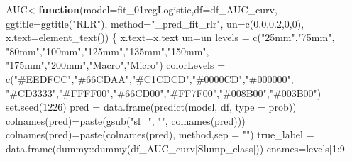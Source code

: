 \documentclass[
]{article}
\newenvironment{Shaded}{\begin{snugshade}}{\end{snugshade}}
\newcommand{\AttributeTok}[1]{\textcolor[rgb]{0.77,0.63,0.00}{#1}}
\newcommand{\ControlFlowTok}[1]{\textcolor[rgb]{0.13,0.29,0.53}{\textbf{#1}}}
\newcommand{\DecValTok}[1]{\textcolor[rgb]{0.00,0.00,0.81}{#1}}
\newcommand{\FloatTok}[1]{\textcolor[rgb]{0.00,0.00,0.81}{#1}}
\newcommand{\FunctionTok}[1]{\textcolor[rgb]{0.00,0.00,0.00}{#1}}
\newcommand{\NormalTok}[1]{#1}
\newcommand{\OtherTok}[1]{\textcolor[rgb]{0.56,0.35,0.01}{#1}}
\newcommand{\SpecialCharTok}[1]{\textcolor[rgb]{0.00,0.00,0.00}{#1}}
\newcommand{\StringTok}[1]{\textcolor[rgb]{0.31,0.60,0.02}{#1}}
\begin{document}
\begin{Shaded}
\begin{Highlighting}[]
\NormalTok{AUC}\OtherTok{\textless{}{-}}\ControlFlowTok{function}\NormalTok{(}\AttributeTok{model=}\NormalTok{fit\_01regLogistic,}\AttributeTok{df=}\NormalTok{df\_AUC\_curv, }\AttributeTok{ggtitle=}\FunctionTok{ggtitle}\NormalTok{(}\StringTok{"RLR"}\NormalTok{),}
              \AttributeTok{method=}\StringTok{"\_pred\_fit\_rlr"}\NormalTok{, }\AttributeTok{un=}\FunctionTok{c}\NormalTok{(}\FloatTok{0.0}\NormalTok{,}\FloatTok{0.2}\NormalTok{,}\DecValTok{0}\NormalTok{,}\DecValTok{0}\NormalTok{),}
              \AttributeTok{x.text=}\FunctionTok{element\_text}\NormalTok{()) \{}
\NormalTok{    x.text}\OtherTok{=}\NormalTok{x.text}
\NormalTok{    un}\OtherTok{=}\NormalTok{un}
\NormalTok{    levels }\OtherTok{=} \FunctionTok{c}\NormalTok{(}\StringTok{"25mm"}\NormalTok{,}\StringTok{"75mm"}\NormalTok{, }\StringTok{"80mm"}\NormalTok{,}\StringTok{"100mm"}\NormalTok{,}\StringTok{"125mm"}\NormalTok{,}\StringTok{"135mm"}\NormalTok{,}\StringTok{"150mm"}\NormalTok{,}
               \StringTok{"175mm"}\NormalTok{,}\StringTok{"200mm"}\NormalTok{,}\StringTok{"Macro"}\NormalTok{,}\StringTok{"Micro"}\NormalTok{)}
\NormalTok{    colorLevels }\OtherTok{=} \FunctionTok{c}\NormalTok{(}\StringTok{"\#EEDFCC"}\NormalTok{,}\StringTok{"\#66CDAA"}\NormalTok{,}\StringTok{"\#C1CDCD"}\NormalTok{,}\StringTok{"\#0000CD"}\NormalTok{,}\StringTok{"\#000000"}\NormalTok{,}
                    \StringTok{"\#CD3333"}\NormalTok{,}\StringTok{"\#FFFF00"}\NormalTok{,}\StringTok{"\#66CD00"}\NormalTok{,}\StringTok{"\#FF7F00"}\NormalTok{,}\StringTok{"\#008B00"}\NormalTok{,}\StringTok{"\#003B00"}\NormalTok{)}
    \FunctionTok{set.seed}\NormalTok{(}\DecValTok{1226}\NormalTok{)}
\NormalTok{    pred }\OtherTok{=} \FunctionTok{data.frame}\NormalTok{(}\FunctionTok{predict}\NormalTok{(model, df, }\AttributeTok{type =} \StringTok{\textquotesingle{}prob\textquotesingle{}}\NormalTok{))}
    \FunctionTok{colnames}\NormalTok{(pred)}\OtherTok{=}\FunctionTok{paste}\NormalTok{(}\FunctionTok{gsub}\NormalTok{(}\StringTok{"sl\_"}\NormalTok{, }\StringTok{""}\NormalTok{, }\FunctionTok{colnames}\NormalTok{(pred)))}
    \FunctionTok{colnames}\NormalTok{(pred)}\OtherTok{=}\FunctionTok{paste}\NormalTok{(}\FunctionTok{colnames}\NormalTok{(pred), method,}\AttributeTok{sep =} \StringTok{""}\NormalTok{)}
\NormalTok{    true\_label }\OtherTok{=} \FunctionTok{data.frame}\NormalTok{(dummy}\SpecialCharTok{::}\FunctionTok{dummy}\NormalTok{(df\_AUC\_curv[}\StringTok{\textquotesingle{}Slump\_class\textquotesingle{}}\NormalTok{]))}
\NormalTok{    cnames}\OtherTok{=}\NormalTok{levels[}\DecValTok{1}\SpecialCharTok{:}\DecValTok{9}\NormalTok{]}

\end{Highlighting}
\end{Shaded}
\end{document}
